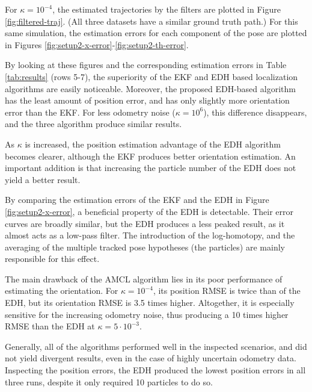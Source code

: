 For $\kappa = 10^{-4}$, the estimated trajectories by the filters are plotted in Figure \ref{fig:filtered-traj}.
(All three datasets have a similar ground truth path.) For this same simulation, the
estimation errors for each component of the pose are plotted
in Figures \ref{fig:setup2-x-error}-\ref{fig:setup2-th-error}.

By looking at these figures and the corresponding estimation errors in
Table \ref{tab:results} (rows 5-7), the superiority of the EKF and EDH based
localization algorithms are easily noticeable.
Moreover, the proposed EDH-based algorithm has the least amount of position error, and has only
slightly more orientation error than the EKF.
For less odometry noise ($\kappa = 10^6$), this difference disappears, and the three algorithm
produce similar results.

As $\kappa$ is increased, the position estimation advantage of the EDH algorithm becomes clearer,
although the EKF produces better orientation estimation. An important addition is that increasing
the particle number of the EDH does not yield a better result.

By comparing the estimation errors of the EKF and the EDH in Figure \ref{fig:setup2-x-error},
a beneficial property of the EDH is detectable.
Their error curves are broadly similar, but the EDH produces a less peaked
result, as it almost acts as a low-pass filter. The introduction of the log-homotopy,
and the averaging of the multiple tracked pose hypotheses (the particles)
are mainly responsible for this effect.

The main drawback of the AMCL algorithm lies in its poor performance of estimating
the orientation.  For $\kappa = 10^{-4}$, its position RMSE is twice than of the EDH,
but its orientation RMSE is 3.5 times higher.
Altogether, it is especially sensitive for the increasing odometry noise,
thus producing a 10 times higher RMSE than the EDH at $\kappa = 5\cdot10^{-3}$.

Generally, all of the algorithms performed well in the inspected scenarios, and
did not yield divergent results, even in the case of highly uncertain odometry data.
Inspecting the position errors, the EDH produced the lowest position errors in
all three runs, despite it only required 10 particles to do so.

